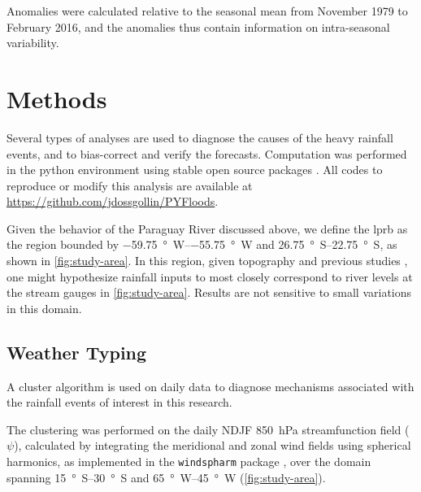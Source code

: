 \documentclass[twocol]{ametsoc}
\begin{document}
Anomalies were calculated relative to the seasonal mean from November 1979 to February 2016, and the anomalies thus contain information on intra-seasonal variability.


\section{Methods} \label{sec:methods}

Several types of analyses are used to diagnose the causes of the heavy rainfall events, and to bias-correct and verify the forecasts.
Computation was performed in the python environment using stable open source packages \citep{Hoyer2017,vanderWalt2011,McKinney2010,Hunter2007}.
All codes to reproduce or modify this analysis are available at \url{https://github.com/jdossgollin/PYFloods}.

Given the behavior of the Paraguay River discussed above, we define the \acrlong{lprb} as the region bounded by \SIrange{-59.75}{-55.75}{\degree W} and \SIrange{26.75}{22.75}{\degree S}, as shown in \cref{fig:study-area}.
In this region, given topography and previous studies \citep{Barros2004,Bravo2011}, one might hypothesize rainfall inputs to most closely correspond to river levels at the stream gauges in \cref{fig:study-area}.
Results are not sensitive to small variations in this domain.

\subsection{Weather Typing} \label{sec:weather-typing}

A cluster algorithm is used on daily data to diagnose mechanisms associated with the rainfall events of interest in this research.

The clustering was performed on the daily NDJF \SI{850}{\hecto\pascal} streamfunction field ($\psi$), calculated by integrating the meridional and zonal wind fields using spherical harmonics, as implemented in the \texttt{windspharm} package \citep{Dawson2016}, over the domain spanning \SIrange{15}{30}{\degree S} and \SIrange{65}{45}{\degree W} (\cref{fig:study-area}).
\end{document}
